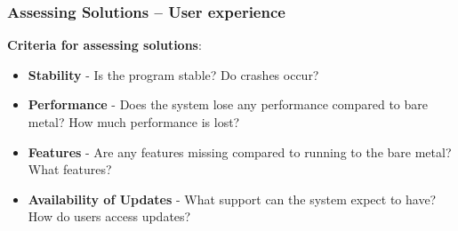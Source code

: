 \begin{frame}
\frametitle{Assessing Solutions – User experience}
\begin{theorembox}
\textbf{Criteria for assessing solutions}: \\
\begin{itemize}
    \setlength{\itemsep}{8pt}
    \item \textbf{Stability} - Is the program stable? Do crashes occur? 
    \item \textbf{Performance} - Does the system lose any performance compared to bare metal? How much performance is lost?
    \item \textbf{Features} - Are any features missing compared to running to the bare metal? What features?
    \item \textbf{Availability of Updates} - What support can the system expect to have? How do users access updates?
\end{itemize}
\end{theorembox}
\end{frame}